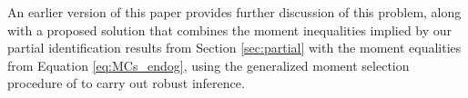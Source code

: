 An earlier version of this paper \citep{DiTragliaGarciaWP2017} provides further discussion of this problem, along with a proposed solution that combines the moment inequalities implied by our partial identification results from Section \ref{sec:partial} with the moment equalities from Equation \ref{eq:MCs_endog}, using the generalized moment selection procedure of \cite{AndrewsSoares} to carry out robust inference.
